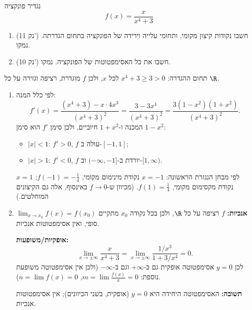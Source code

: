 
\begin{question}
נגדיר פונקציה
\[ f(x) = \frac{x}{x^4 + 3} \]
\begin{enumerate}
  \item (11 נק') חשבו נקודות קיצון מקומי, ותחומי עלייה וירידה של הפונקציה בתחום הגדרתה. נמקו.
  \item (10 נק') חשבו את כל האסימפטוטות של הפונקציה. נמקו.
\end{enumerate}
\end{question}

\begin{solution}
תחום ההגדרה: $x^4 + 3 \ge 3 > 0$ לכל $x$, ולכן $f$ מוגדרת, רציפה וגזירה על כל $\R$.
\begin{enumerate}
  \item לפי כלל המנה:
  \[ f'(x) = \frac{(x^4 + 3) - x\cdot 4x^3}{(x^4+3)^2} = \frac{3 - 3x^4}{(x^4 + 3)^2} = \frac{3(1 - x^2)(1 + x^2)}{(x^4+3)^2}. \]
  המכנה ו-$1 + x^2$ חיוביים, ולכן סימן $f'$ הוא סימן $1 - x^2$:
  \begin{itemize}
    \item $|x| < 1$: $f' > 0$, $f$ עולה ב-$[-1, 1]$;
    \item $|x| > 1$: $f' < 0$, $f$ יורדת ב-$(-\infty, -1]$ וב-$[1, \infty)$.
  \end{itemize}
  לפי מבחן הנגזרת הראשונה: $x=-1$ נקודת מינימום מקומי, $f(-1) = -\frac14$; $x = 1$ נקודת מקסימום מקומי, $f(1) = \frac14$.
  (מכיוון ש-$f\to0$ באינסוף, אלה גם הקיצונים המוחלטים.)

  \item \textbf{אנכיות:} $f$ רציפה על כל $\R$, ולכן בכל נקודה $x_0$ מתקיים $\lim_{x\to x_0}f(x) = f(x_0)$ סופי, ואין אסימפטוטות אנכיות.

  \textbf{אופקיות/משופעות:}
  \[ \lim_{x\to\pm\infty}\frac{x}{x^4 + 3} = \lim_{x\to\pm\infty}\frac{1/x^3}{1 + 3/x^4} = 0. \]
  לכן $y = 0$ אסימפטוטה אופקית גם ב-$+\infty$ וגם ב-$-\infty$ (ולכן אין אסימפטוטה משופעת נוספת: $m = \lim \frac{f(x)}{x} = 0$, $n = \lim f(x) = 0$).

  \textbf{תשובה:} האסימפטוטה היחידה היא $y = 0$ (אופקית, בשני הכיוונים); אין אסימפטוטות אנכיות.
\end{enumerate}
\end{solution}
